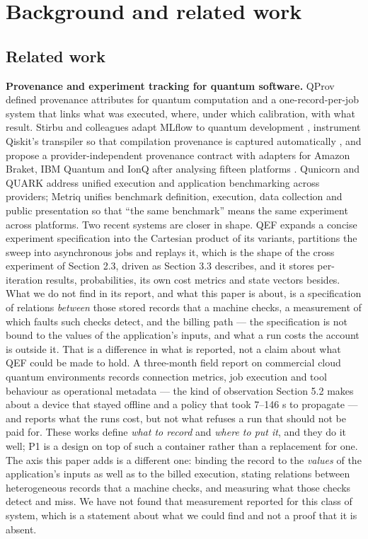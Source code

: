 \documentclass[acmsmall,screen,review]{acmart}
\begin{document}
\section{Background and related work}

\subsection{Related work}

\textbf{Provenance and experiment tracking for quantum software.} QProv \cite{ref2} defined provenance attributes for quantum computation and a one-record-per-job system that links what was executed, where, under which calibration, with what result. Stirbu and colleagues adapt MLflow to quantum development \cite{ref3}, instrument Qiskit's transpiler so that compilation provenance is captured automatically \cite{ref4}, and propose a provider-independent provenance contract with adapters for Amazon Braket, IBM Quantum and IonQ after analysing fifteen platforms \cite{ref5}. Qunicorn \cite{ref6} and QUARK \cite{ref7} address unified execution and application benchmarking across providers; Metriq \cite{ref8} unifies benchmark definition, execution, data collection and public presentation so that ``the same benchmark'' means the same experiment across platforms. Two recent systems are closer in shape. QEF \cite{ref9} expands a concise experiment specification into the Cartesian product of its variants, partitions the sweep into asynchronous jobs and replays it, which is the shape of the cross experiment of Section 2.3, driven as Section 3.3 describes, and it stores per-iteration results, probabilities, its own cost metrics and state vectors besides. What we do not find in its report, and what this paper is about, is a specification of relations \textit{between} those stored records that a machine checks, a measurement of which faults such checks detect, and the billing path --- the specification is not bound to the values of the application's inputs, and what a run costs the account is outside it. That is a difference in what is reported, not a claim about what QEF could be made to hold. A three-month field report on commercial cloud quantum environments \cite{ref10} records connection metrics, job execution and tool behaviour as operational metadata --- the kind of observation Section 5.2 makes about a device that stayed offline and a policy that took 7--146 s to propagate --- and reports what the runs cost, but not what refuses a run that should not be paid for. These works define \textit{what to record} and \textit{where to put it}, and they do it well; P1 is a design on top of such a container rather than a replacement for one. The axis this paper adds is a different one: binding the record to the \textit{values} of the application's inputs as well as to the billed execution, stating relations between heterogeneous records that a machine checks, and measuring what those checks detect and miss. We have not found that measurement reported for this class of system, which is a statement about what we could find and not a proof that it is absent.
\end{document}
